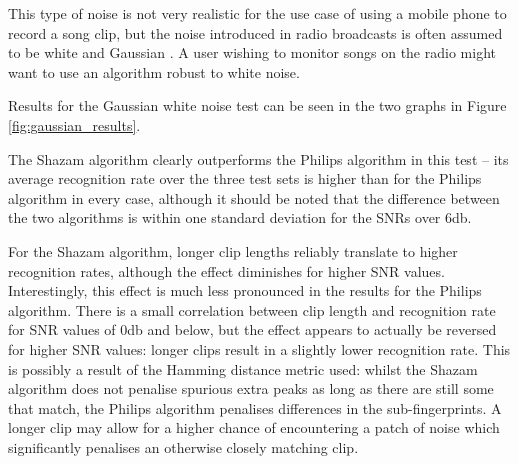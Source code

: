 \documentclass[12pt,a4paper,twoside,openright]{report}
\begin{document}
This type of noise is not very realistic for the use case of using a mobile phone to record a song clip, but the noise introduced in radio broadcasts is often assumed to be white and Gaussian \cite{Sonnenschein92}. A user wishing to monitor songs on the radio might want to use an algorithm robust to white noise.

Results for the Gaussian white noise test can be seen in the two graphs in Figure \ref{fig:gaussian_results}. 

The Shazam algorithm clearly outperforms the Philips algorithm in this test -- its average recognition rate over the three test sets is higher than for the Philips algorithm in every case, although it should be noted that the difference between the two algorithms is within one standard deviation for the SNRs over 6db.

For the Shazam algorithm, longer clip lengths reliably translate to higher recognition rates, although the effect diminishes for higher SNR values. Interestingly, this effect is much less pronounced in the results for the Philips algorithm. There is a small correlation between clip length and recognition rate for SNR values of 0db and below, but the effect appears to actually be reversed for higher SNR values: longer clips result in a slightly lower recognition rate. This is possibly a result of the Hamming distance metric used: whilst the Shazam algorithm does not penalise spurious extra peaks as long as there are still some that match, the Philips algorithm penalises differences in the sub-fingerprints. A longer clip may allow for a higher chance of encountering a patch of noise which significantly penalises an otherwise closely matching clip.
\end{document}
